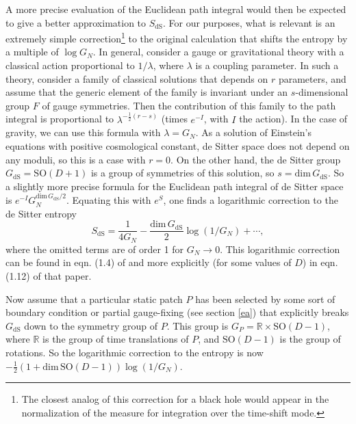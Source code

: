 \documentclass[11pt,a4paper]{article}
\def\dim{{\mathrm{dim}}}
\def\be{\begin{equation}}
\def\ee{\end{equation}}
\def\R{{\mathbb R}}
\def\dS{{\mathrm{dS}}}
\def\SO{{\mathrm{SO}}}
\begin{document}
A more precise evaluation of the Euclidean path integral would then be expected to give a better approximation to $S_\dS$.   For our purposes, what is 
relevant is an extremely simple correction\footnote{The closest analog of this correction for a black hole would appear in the normalization of the measure
for integration over the time-shift mode.}  to the original calculation that shifts the entropy by a multiple of $\log G_N$.   In general, consider a  gauge or gravitational
theory with a classical action 
proportional to $1/\lambda$, where $\lambda$ is a coupling parameter.
In such a theory, consider a family 
 of classical solutions that depends on $r$ parameters,
and assume that the generic element of the family is invariant under an $s$-dimensional group $F$ of gauge symmetries.   Then the
contribution of this family to the path integral is proportional to $\lambda^{-\frac{1}{2}(r-s)}$ (times $e^{-I}$, with $I$ the action).
In the case of gravity, we can use this formula with $\lambda=G_N$.   As a solution of Einstein's equations with positive cosmological constant, de Sitter space
does not depend on any moduli, so this is a case with $r=0$.   On the other hand, the de Sitter group $G_\dS=\SO(D+1)$ is a group of symmetries of
this solution, so $s=\dim\,G_\dS$.   So a slightly more precise formula for the Euclidean path integral of de Sitter space is $e^{-I} G_N^{\dim\,G_\dS/2}.$
Equating this with $e^S$, one finds a logarithmic correction to the de Sitter entropy
\be\label{jumper}S_\dS=\frac{1}{4G_N} -\frac{\dim\,G_\dS}{2}\log(1/G_N)+\cdots, \ee
where the omitted terms are of order 1 for $G_N\to 0$.    This logarithmic correction can be found in eqn. (1.4) of \cite{Denef} and more explicitly (for some values of $D$)
in eqn. (1.12) of that paper.

Now assume that a particular static patch $P$ has been selected by some sort of boundary condition or partial gauge-fixing (see section \ref{ea})
that explicitly breaks $G_\dS$ down to the symmetry
group  of $P$.
  This group is $G_P=\R\times \SO(D-1)$, where $\R$ is the group of time translations of $P$, and $\SO(D-1)$ is the group
of rotations.  So the logarithmic correction to the entropy is now $-\frac{1}{2}\left(1+\dim \,\SO(D-1)\right) \log(1/G_N)$.   
\end{document}
